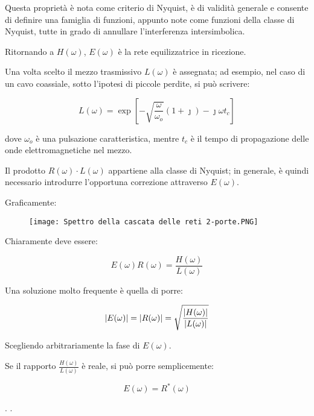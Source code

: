 Questa proprietà è nota come criterio di Nyquist, è di validità generale e consente di definire una famiglia di funzioni, 
appunto note come funzioni della classe di Nyquist, tutte in grado di annullare l'interferenza intersimbolica. \newline 

Ritornando a $H(\omega)$, $E(\omega)$ è la rete equilizzatrice in ricezione. \newline 

Una volta scelto il mezzo trasmissivo $L(\omega)$ è assegnata; ad esempio, nel caso di un cavo coassiale, sotto l'ipotesi di piccole perdite, si può scrivere: 

{
    \Large 
    \begin{equation}
        L(\omega) = \exp [- \sqrt{\frac{\omega}{\omega_o}} (1+ \jmath) -\jmath \omega t_c]
    \end{equation}
}

dove $\omega_o$ è una pulsazione caratteristica, mentre $t_c$ è il tempo di propagazione delle onde elettromagnetiche nel mezzo. \newline 

Il prodotto $R(\omega) \cdot L (\omega)$ appartiene alla classe di Nyquist; 
in generale, è quindi necessario introdurre l'opportuna correzione attraverso $E(\omega)$. \newline 

Graficamente: 

\begin{figure}[h]
    \centering
    \texttt{[image: Spettro della cascata delle reti 2-porte.PNG]}
\end{figure}


Chiaramente deve essere: 

{
    \Large 
    \begin{equation}
        E(\omega) R(\omega) = \frac{H(\omega)}{L(\omega)}
    \end{equation}
}

Una soluzione molto frequente è quella di porre: 

{
    \Large 
    \begin{equation}
        \abs{E(\omega)} = \abs{R(\omega)} = \sqrt{\frac{\abs{H(\omega)}}{\abs{L(\omega)}}}
    \end{equation}
}

Scegliendo arbitrariamente la fase di $E(\omega)$. \newline 

Se il rapporto $\frac{H(\omega)}{L(\omega)}$ è reale, si può porre semplicemente: 

{
    \Large 
    \begin{equation}
        E(\omega) = R^{*} (\omega)
    \end{equation}
}

\newpage 
. 
\newpage 
. 
\newpage